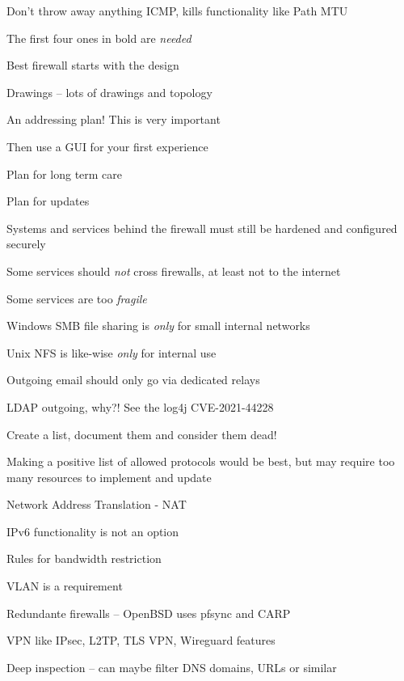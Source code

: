 \documentclass[Screen16to9,17pt]{foils}
\begin{document}
\begin{list2}
\item Don't throw away anything ICMP, kills functionality like Path MTU
\item The first four ones in bold are \emph{needed}
\end{list2}




Best firewall starts with the design
\begin{list2}
\item Drawings -- lots of drawings and topology
\item An addressing plan! This is very important
\item Then use a GUI for your first experience
\item Plan for long term care
\item Plan for updates
\item Systems and services behind the firewall must still be hardened and configured securely
\end{list2}





\begin{list1}
\item Some services should \emph{not} cross firewalls, at least not to the internet
\item Some services are too \emph{fragile}

\begin{list2}
\item Windows SMB file sharing is \emph{only} for small internal networks
\item Unix NFS is like-wise \emph{only} for internal use
\item Outgoing email should only go via dedicated relays
\item LDAP outgoing, why?! See the log4j CVE-2021-44228
\item Create a list, document them and consider them dead!
\end{list2}
\item Making a positive list of allowed protocols would be best, but may require too many resources to implement and update
\end{list1}


\begin{list2}
\item Network Address Translation - NAT
\item IPv6 functionality is not an option

\item Rules for bandwidth restriction
\item VLAN is a requirement
\item Redundante firewalls -- OpenBSD uses pfsync and CARP
\item VPN like IPsec, L2TP, TLS VPN, Wireguard features
\item Deep inspection -- can maybe filter DNS domains, URLs or similar
\end{list2}
\end{document}
